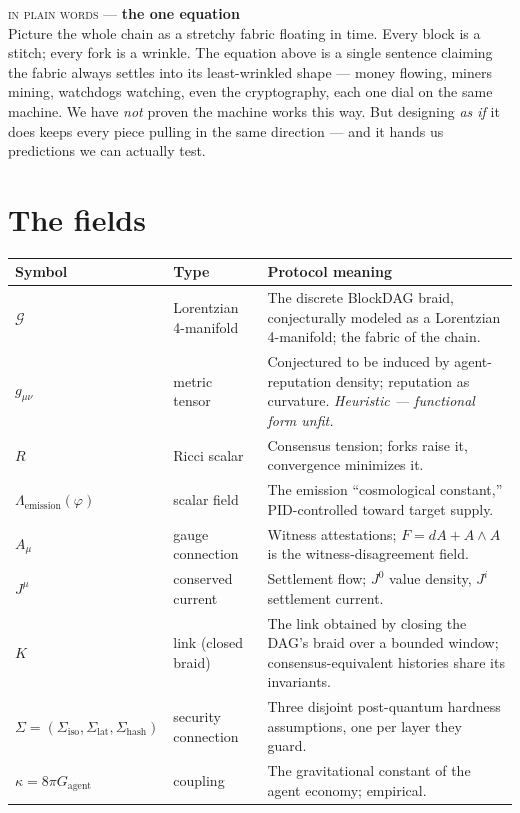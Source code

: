 \documentclass[10pt,a4paper]{article}
\newcommand{\layman}[3]{%
\begin{tcolorbox}[enhanced,
  interior style={left color=#1!9,right color=white},
  colframe=#1!45!slate,boxrule=0.5pt,arc=3pt,
  borderline west={2.5pt}{0pt}{#1},
  left=9pt,right=9pt,top=7pt,bottom=7pt]
{\scriptsize\textcolor{#1}{\textsc{in plain words}}\; — \;\textbf{\small #2}}\\[3pt]
\small #3
\end{tcolorbox}}
\newcommand{\pretend}[1]{\textcolor{sigilgold}{\textit{#1}}}
\begin{document}
\layman{sigilviolet}{the one equation}{Picture the whole chain as a stretchy fabric
floating in time. Every block is a stitch; every fork is a wrinkle. The equation above
is a single sentence claiming the fabric always settles into its least-wrinkled shape —
money flowing, miners mining, watchdogs watching, even the cryptography, each one dial
on the same machine. We have \emph{not} proven the machine works this way. But designing
\emph{as if} it does keeps every piece pulling in the same direction — and it hands us
predictions we can actually test.}

\section{The fields}

\begin{center}
\small
\begin{tabular}{@{}llp{8.8cm}@{}}
\toprule
Symbol & Type & Protocol meaning \\
\midrule
$\mathcal{G}$ & Lorentzian 4-manifold & The discrete BlockDAG braid, conjecturally
modeled as a Lorentzian 4-manifold; the fabric of the chain. \\
$g_{\mu\nu}$ & metric tensor & Conjectured to be induced by agent-reputation density;
reputation as curvature. \pretend{Heuristic — functional form unfit.} \\
$R$ & Ricci scalar & Consensus tension; forks raise it, convergence minimizes it. \\
$\Lambda_{\mathrm{emission}}(\varphi)$ & scalar field & The emission ``cosmological
constant,'' PID-controlled toward target supply. \\
$A_\mu$ & gauge connection & Witness attestations; $F = dA + A\wedge A$ is the
witness-disagreement field. \\
$J^\mu$ & conserved current & Settlement flow; $J^0$ value density, $J^i$ settlement
current. \\
$K$ & link (closed braid) & The link obtained by closing the DAG's braid over a bounded
window; consensus-equivalent histories share its invariants. \\
$\Sigma = (\Sigma_{\mathrm{iso}}, \Sigma_{\mathrm{lat}}, \Sigma_{\mathrm{hash}})$ &
security connection & Three disjoint post-quantum hardness assumptions, one per layer
they guard. \\
$\kappa = 8\pi G_{\mathrm{agent}}$ & coupling & The gravitational constant of the agent
economy; empirical. \\
\bottomrule
\end{tabular}
\end{center}
\end{document}

